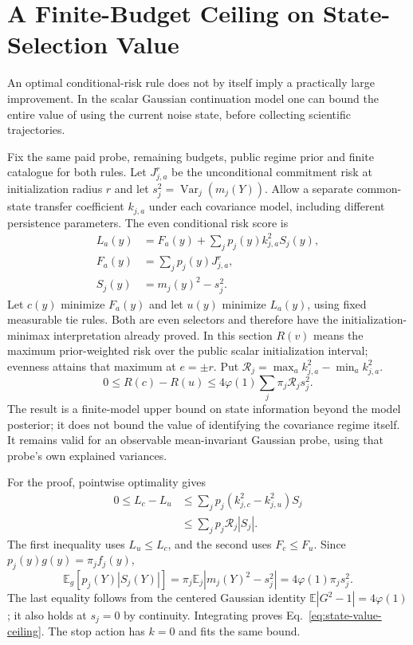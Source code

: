 \section{A Finite-Budget Ceiling on State-Selection Value}
An optimal conditional-risk rule does not by itself imply a practically large improvement.
In the scalar Gaussian continuation model one can bound the entire value of using the current noise state, before collecting scientific trajectories.

Fix the same paid probe, remaining budgets, public regime prior and finite catalogue for both rules.
Let $J_{j,a}^{r}$ be the unconditional commitment risk at initialization radius $r$ and let $s_j^2=\operatorname{Var}_j(m_j(Y))$.
Allow a separate common-state transfer coefficient $k_{j,a}$ under each covariance model, including different persistence parameters.
The even conditional risk score is
\begin{align*}
L_a(y)&=F_a(y)+\sum_jp_j(y)k_{j,a}^2S_j(y),\\
F_a(y)&=\sum_jp_j(y)J_{j,a}^{r},\\
S_j(y)&=m_j(y)^2-s_j^2.
\end{align*}
Let $c(y)$ minimize $F_a(y)$ and let $u(y)$ minimize $L_a(y)$, using fixed measurable tie rules.
Both are even selectors and therefore have the initialization-minimax interpretation already proved.
In this section $R(v)$ means the maximum prior-weighted risk over the public scalar initialization interval; evenness attains that maximum at $e=\pm r$.
Put $\mathcal R_j=\max_a k_{j,a}^2-\min_a k_{j,a}^2$.
\begin{equation}
0\le R(c)-R(u)\le4\varphi(1)\sum_j\pi_j\mathcal R_js_j^2.
\label{eq:state-value-ceiling}
\end{equation}
The result is a finite-model upper bound on state information beyond the model posterior; it does not bound the value of identifying the covariance regime itself.
It remains valid for an observable mean-invariant Gaussian probe, using that probe's own explained variances.

For the proof, pointwise optimality gives
\begin{align*}
0\le L_c-L_u&\le\sum_jp_j(k_{j,c}^2-k_{j,u}^2)S_j\\
&\le\sum_jp_j\mathcal R_j|S_j|.
\end{align*}
The first inequality uses $L_u\le L_c$, and the second uses $F_c\le F_u$.
Since $p_j(y)g(y)=\pi_jf_j(y)$,
\[
\mathbb E_g[p_j(Y)|S_j(Y)|]=\pi_j\mathbb E_j|m_j(Y)^2-s_j^2|
=4\varphi(1)\pi_js_j^2.
\]
The last equality follows from the centered Gaussian identity $\mathbb E|G^2-1|=4\varphi(1)$; it also holds at $s_j=0$ by continuity.
Integrating proves Eq.~\eqref{eq:state-value-ceiling}.
The stop action has $k=0$ and fits the same bound.

